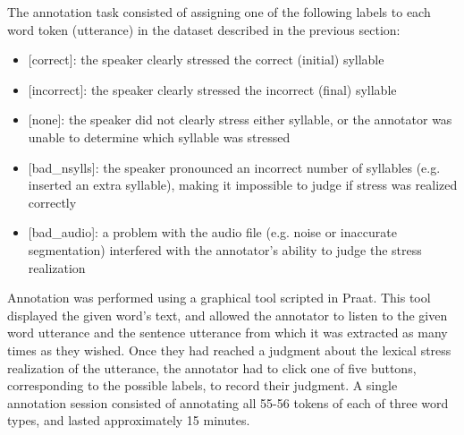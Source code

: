 \documentclass[a4paper]{article}
\begin{document}
		The annotation task consisted of assigning one of the following labels to each word token (utterance) in the dataset described in the previous section:
		\begin{itemize}
	\item{[correct]: the speaker clearly stressed the correct (initial) syllable}
	\item{[incorrect]: the speaker clearly stressed the incorrect (final) syllable}
	\item{[none]: the speaker did not clearly stress either syllable, 
	or the annotator was unable to determine which syllable was stressed}
	\item{[bad\_nsylls]: the speaker pronounced an incorrect number of syllables (e.g. inserted an extra syllable), making it impossible to judge if stress was realized correctly}
	\item{[bad\_audio]: a problem with the audio file (e.g. noise or inaccurate segmentation) interfered with the annotator's ability to judge the stress realization}
	 \end{itemize}
	 
	 Annotation was performed using a graphical tool scripted in Praat. This tool displayed the given word's text, and allowed the annotator to listen to the given word utterance and the sentence utterance from which it was extracted as many times as they wished. Once they had reached a judgment about the lexical stress realization of the utterance, the annotator had to click one of five buttons, corresponding to the possible labels, to record their judgment.
	 A single annotation session consisted of annotating all 55-56 tokens of each of three word types, and lasted approximately 15 minutes.
		
\end{document}
